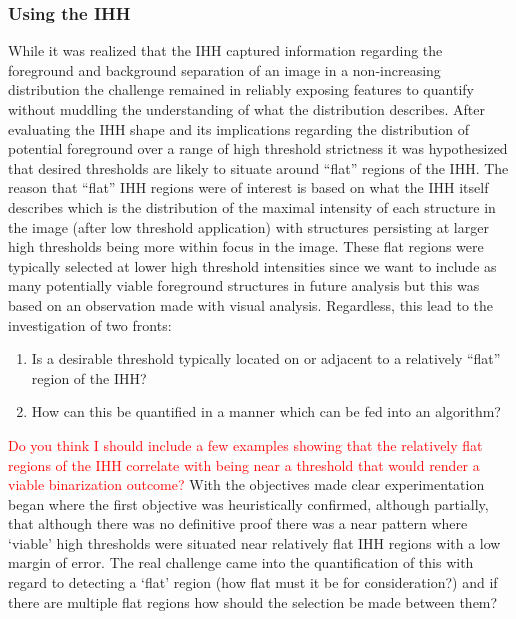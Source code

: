 \subsubsection{Using the IHH}
While it was realized that the IHH captured information regarding the foreground and background separation of an image in a non-increasing distribution the challenge remained in reliably exposing features to quantify without muddling the understanding of what the distribution describes. After evaluating the IHH shape and its implications regarding the distribution of potential foreground over a range of high threshold strictness it was hypothesized that desired thresholds are likely to situate around ``flat'' regions of the IHH. The reason that ``flat'' IHH regions were of interest is based on what the IHH itself describes which is the distribution of the maximal intensity of each structure in the image (after low threshold application) with structures persisting at larger high thresholds being more within focus in the image. These flat regions were typically selected at lower high threshold intensities since we want to include as many potentially viable foreground structures in future analysis but this was based on an observation made with visual analysis. Regardless, this lead to the investigation of two fronts:
\begin{enumerate}
    \item Is a desirable threshold typically located on or adjacent to a relatively ``flat'' region of the IHH?
    \item How can this be quantified in a manner which can be fed into an algorithm?
\end{enumerate}
\textcolor{red}{Do you think I should include a few examples showing that the relatively flat regions of the IHH correlate with being near a threshold that would render a viable binarization outcome?}
With the objectives made clear experimentation began where the first objective was heuristically confirmed, although partially, that although there was no definitive proof there was a near pattern where `viable' high thresholds were situated near relatively flat IHH regions with a low margin of error. The real challenge came into the quantification of this with regard to detecting a `flat' region (how flat must it be for consideration?) and if there are multiple flat regions how should the selection be made between them?
